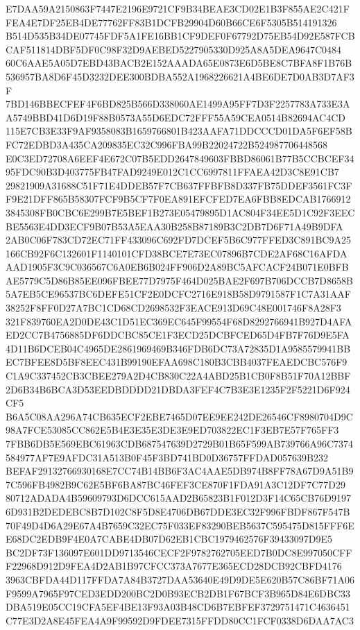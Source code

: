 \documentclass[UTF8,fontset=fandol,zihao=-4,a4paper]{ctexart}
\begin{document}
{{E7DAA59A2150863F7447E2196E9721CF9B34BEAE3CD02E1B3F855AE2C421FFEA4E7DF25EB4DE77762FF83B1DCFB29904D60B66CE6F5305B514191326
B514D535B34DE07745FDF5A1FE16BB1CF9DEF0F67792D75EB54D92E587FCBCAF511814DBF5DF0C98F32D9AEBED5227905330D925A8A5DEA9647C0484
60C6AAE5A05D7EBD43BACB2E152AAADA65E0873E6D5BE8C7BFA8F1B76B536957BA8D6F45D3232DEE300BDBA552A1968226621A4BE6DE7D0AB3D7AF3F
7BD146BBECFEF4F6BD825B566D338060AE1499A95FF7D3F2257783A733E3AA5749BBD41D6D19F88B0573A55D6EDC72FFF55A59CEA0514B82694AC4CD
115E7CB3E33F9AF9358083B1659766801B423AAFA71DDCCCD01DA5F6EF58BFC72EDBD3A435CA209835EC32C996FBA99B22024722B524987706448568
E0C3ED72708A6EEF4E672C07B5EDD2647849603FBBD86061B77B5CCBCEF3495FDC90B3D403775FB47FAD9249E012C1CC6997811FFAEA42D3C8E91CB7
29821909A31688C51F71E4DDEB57F7CB637FFBFB8D337FB75DDEF3561FC3FF9E21DFF865B58307FCF9B5CF7F0EA891EFCFED7EA6FBB8EDCAB1766912
3845308FB0CBC6E299B7E5BEF1B273E05479895D1AC804F34EE5D1C92F3EECBE5563E4DD3ECF9B07B53A5EAA30B258B87189B3C2DB7D6F71A49B9DFA
2AB0C06F783CD72EC71FF433096C692FD7DCEF5B6C977FFED3C891BC9A25166CB92F6C132601F1140101CFD38BCE7E73EC07896B7CDE2AF68C16AFDA
AAD1905F3C9C036567C6A0EB6B024FF906D2A89BC5AFCACF24B071E0BFBAE5779C5D86B85EE096FBEE77D7975F464D025BAE2F697B706DCCB7D8658B
5A7EB5CE96537BC6DEFE51CF2E0DCFC2716E918B58D9791587F1C7A31AAF38252F8FF0D27A7BC1CD68CD2698532F3EACE913D69C48E001746F8A28F3
321F839760EA2D0DE43C1D51EC369EC645F99554F68D8292766941B927D4AFAED2CC7B4756885DF6DDCBC85CE1F3ECD25DCBFCED65D4FB7F76D9E5FA
4D11B6DCEB04C4965DE2861969469B346FDB6DC73A72835D1A9585579941BBEC7BFEE8D5BF8EEC431B99190EFAA698C180B3CBB4037FEAEDCBC576F9
C1A9C337452CB3CBEE279A2D4CB830C22A4ABD25B1CB0F8B51F70A12BBF2D6B34B6BCA3D53EEDBDDDD21DBDA3FEF4C7B3E3E1235F2F5221D6F924CF5
B6A5C08AA296A74CB635ECF2EBE7465D07EE9EE242DE26546CF8980704D9C98A7FCE53085CC862E5B4E3E35E3DE3E9ED703822EC1F3EB7E57F765FF3
7FBB6DB5E569EBC61963CDB687547639D2729B01B65F599AB739766A96C7374584977AF7E9AFDC31A513B0F45F3BD741BD0D36757FFDAD057639B232
BEFAF29132766930168E7CC74B14BB6F3AC4AAE5DB974B8FF78A67D9A51B97C596FB4982B9C62E5BF6BA87BC46FEF3CE870F1FDA91A3C12DF7C77D29
80712ADADA4B59609793D6DCC615AAD2B65823B1F012D3F14C65CB76D91976D931B2DEDEBC8B7D102C8F5D8E4706DB67DDE3EC32F996FBDF867F547B
70F49D4D6A29E67A4B7659C32EC75F033EF83290BEB5637C595475D815FFF6EE68DC2EDB9F4E0A7CABE4DB07D62EB1CBC1979462576F39433097D9E5
BC2DF73F136097E601DD9713546CECF2F9782762705EED7B0DC8E997050CFFF22968D912D9FEA4D2AB1B97CFCC373A7677E365ECD28DCB92CBFD4176
3963CBFDA44D117FFDA7A84B3727DAA53640E49D9DE5E620B57C86BF71A06F9599A7965F97CED3EDD200BC2D0B93ECB2DB1F67BCF3B965D84E6DBC33
DBA519E05CC19CFA5EF4BE13F93A03B48CD6B7EBFEF3729751471C4636451C77E3D2A8E45FEA4A9F99592D9FDEE7315FFDD80CC1FCF0338D6DAA7AC3
}}
\end{document}
